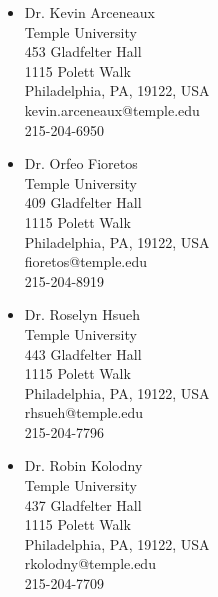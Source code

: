 \documentclass[margin, 12pt]{res} %
\begin{document}
\begin{resume}
\begin{minipage}[ht]{0.5\textwidth}
\begin{itemize}
\item Dr. Kevin Arceneaux \\
Temple University \\
453 Gladfelter Hall \\
1115 Polett Walk \\
Philadelphia, PA, 19122, USA \\
kevin.arceneaux@temple.edu \\
215-204-6950 \\
\end{itemize}

\end{minipage}
\begin{minipage}[ht]{0.5\textwidth}
\begin{itemize}
\item Dr. Orfeo Fioretos \\
Temple University \\
409 Gladfelter Hall \\
1115 Polett Walk \\
Philadelphia, PA, 19122, USA \\
fioretos@temple.edu \\
215-204-8919 \\
\end{itemize}

\begin{itemize}
\item Dr. Roselyn Hsueh \\
Temple University \\
443 Gladfelter Hall \\
1115 Polett Walk \\
Philadelphia, PA, 19122, USA \\
rhsueh@temple.edu \\
215-204-7796 \\
\end{itemize}

\begin{itemize}
\item Dr. Robin Kolodny \\
Temple University \\
437 Gladfelter Hall \\
1115 Polett Walk \\
Philadelphia, PA, 19122, USA \\
rkolodny@temple.edu \\
215-204-7709 \\
\end{itemize}

\end{minipage}


\end{resume}
\end{document}
